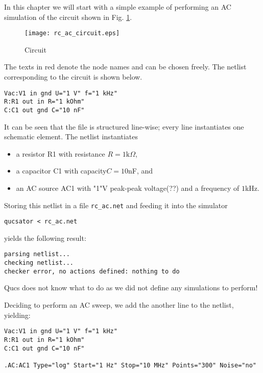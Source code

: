 
In this chapter we will start with a simple example of performing an AC simulation of the circuit shown in Fig. \ref{fig:rc_ac_circuit}.

\begin{figure}[h]
\begin{center}
	\texttt{[image: rc\_ac\_circuit.eps]}
	\caption{Circuit}
	\label{fig:rc_ac_circuit}
\end{center}
\end{figure}

The texts in red denote the node names and can be chosen freely. The netlist corresponding to the circuit is shown below.

\begin{verbatim}
Vac:V1 in gnd U="1 V" f="1 kHz"
R:R1 out in R="1 kOhm"
C:C1 out gnd C="10 nF"
\end{verbatim}

It can be seen that the file is structured line-wise; every line instantiates one schematic element. The netlist instantiates

\begin{itemize}
\item a resistor R1 with resistance $R=1\text{k}\Omega$,
\item a capacitor C1 with capacity$C=10$nF, and
\item an AC source AC1 with "1"V peak-peak voltage(??) and a frequency of $1$kHz.
\end{itemize}

 Storing this netlist in a file \verb+rc_ac.net+ and feeding it into the simulator

\begin{verbatim}
qucsator < rc_ac.net
\end{verbatim}

yields the following result:

\begin{verbatim}
parsing netlist...
checking netlist...
checker error, no actions defined: nothing to do
\end{verbatim}

Qucs does not know what to do as we did not define any simulations to perform!


Deciding to perform an AC sweep, we add the another line to the netlist, yielding:

\begin{verbatim}
Vac:V1 in gnd U="1 V" f="1 kHz"
R:R1 out in R="1 kOhm"
C:C1 out gnd C="10 nF"

.AC:AC1 Type="log" Start="1 Hz" Stop="10 MHz" Points="300" Noise="no"
\end{verbatim}

